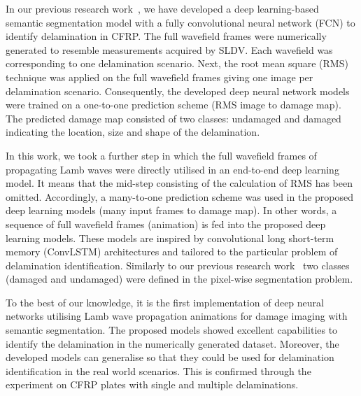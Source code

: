 In our previous research work~\cite{Ijjeh2021}, we have developed a deep learning-based
semantic segmentation model with a fully convolutional neural network (FCN)
to identify delamination in CFRP.
The full wavefield frames were
numerically generated to resemble measurements acquired by SLDV.
Each wavefield was corresponding to one delamination scenario.
Next, the root mean square (RMS) technique
was applied on the full wavefield frames giving one image per delamination scenario.
Consequently,
the developed deep neural network models were trained on a one-to-one prediction scheme (RMS image to damage map).
The predicted damage map consisted of two classes: undamaged and damaged indicating the location, size and shape of the delamination.

In this work, we took a further step in which the full wavefield frames of
propagating Lamb waves were directly utilised in an end-to-end
deep learning model.
It means that the mid-step consisting of the calculation of RMS has been omitted.
Accordingly, a many-to-one
prediction scheme was used in the proposed deep learning models (many input frames to damage map).
In other words, a sequence of full wavefield frames (animation) is fed into the proposed deep learning models.
These models are inspired by convolutional long short-term memory (ConvLSTM) architectures and tailored to the particular problem of delamination identification.
Similarly to our previous research work~\cite{Ijjeh2021} two classes (damaged and undamaged) were defined in the pixel-wise segmentation problem.

To the best of our knowledge, it is the first implementation of deep neural networks utilising Lamb wave propagation animations
for damage imaging with semantic segmentation. 
The proposed models showed excellent capabilities to identify the delamination in the numerically
generated dataset.
Moreover, the developed models can generalise so that they could be used for delamination identification in the real world scenarios.
This is confirmed through the experiment on CFRP plates with single and multiple delaminations.
